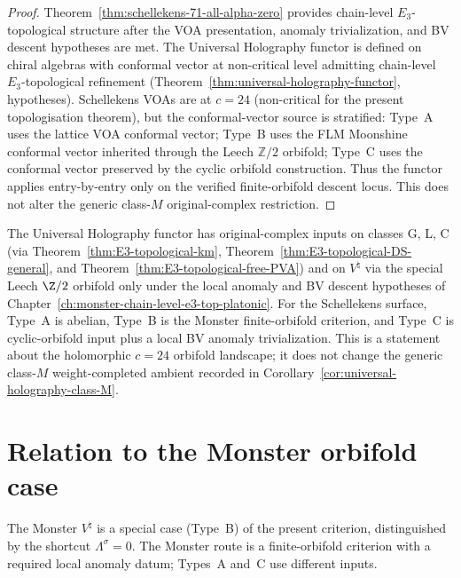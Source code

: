 \begin{proof}
Theorem~\ref{thm:schellekens-71-all-alpha-zero} provides chain-level
$E_3$-topological structure after the VOA presentation, anomaly
trivialization, and BV descent hypotheses are met. The Universal
Holography functor is defined on
chiral algebras with conformal vector at non-critical level
admitting chain-level $E_3$-topological refinement
(Theorem~\ref*{thm:universal-holography-functor}, hypotheses).
Schellekens VOAs are at $c = 24$ (non-critical for the present
topologisation theorem), but the conformal-vector source is
stratified: Type~A uses the lattice VOA conformal vector; Type~B uses
the FLM Moonshine conformal vector inherited through the Leech
$\mathbb Z/2$ orbifold; Type~C uses the conformal vector preserved by
the cyclic orbifold construction. Thus the functor applies
entry-by-entry only on the verified finite-orbifold descent locus. This
does not alter the generic class-$M$ original-complex restriction.
\end{proof}

\begin{remark}
\label{rem:uhf-class-coverage-update}
The Universal Holography functor has original-complex inputs on
classes G, L, C (via Theorem~\ref*{thm:E3-topological-km},
Theorem~\ref*{thm:E3-topological-DS-general}, and
Theorem~\ref*{thm:E3-topological-free-PVA}) and on $V^\natural$ via
the special Leech $\Z/2$ orbifold only under the local anomaly and BV
descent hypotheses of
Chapter~\ref*{ch:monster-chain-level-e3-top-platonic}. For the
Schellekens surface, Type~A is abelian, Type~B is the Monster
finite-orbifold criterion, and Type~C is cyclic-orbifold input plus a
local BV anomaly trivialization. This is a statement about the
holomorphic $c=24$ orbifold landscape; it does not change the generic
class-$M$ weight-completed ambient recorded in
Corollary~\ref*{cor:universal-holography-class-M}.
\end{remark}

\section{Relation to the Monster orbifold case}
\label{sec:schellekens-71-vs-monster}

The Monster $V^\natural$ is a special case (Type~B) of the present
criterion, distinguished by the shortcut
$\Lambda^\sigma = 0$. The Monster route is a finite-orbifold
criterion with a required local anomaly datum; Types~A and~C use
different inputs.


